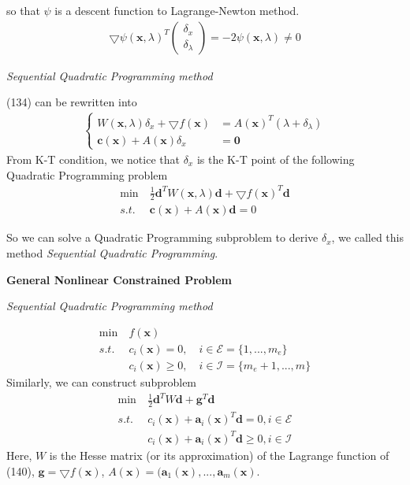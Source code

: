 \documentclass[runningheads]{llncs}
\begin{document}
so that $\psi$ is a descent function to Lagrange-Newton method.
\begin{align}
    \bigtriangledown \psi(\mathbf{x}, \lambda)^T
    \left(\begin{array}{ll}
        \delta_{x} \\
        \delta_\lambda
    \end{array}\right) = 
    -2 \psi(\mathbf{x}, \lambda) \neq 0
\end{align}
\par
\emph{Sequential Quadratic Programming method}
\par
(134) can be rewritten into
\begin{align}
    \left\{
        \begin{array}{ll}
            W(\mathbf{x}, \lambda) \delta_x + \bigtriangledown f(\mathbf{x})
            &= A(\mathbf{x})^T(\lambda + \delta_\lambda) \\
            \mathbf{c}(\mathbf{x}) + A(\mathbf{x})\delta_x &= \mathbf{0}
        \end{array}
        \right.
\end{align}
From K-T condition, we notice that $\delta_x$ is the
K-T point of the following Quadratic Programming problem
\begin{align}
    \min \ &\frac{1}{2} \mathbf{d}^T W(\mathbf{x}, \lambda) \mathbf{d}
    + \bigtriangledown f(\mathbf{x})^T\mathbf{d} \\
    s.t. \ &\mathbf{c}(\mathbf{x}) + A(\mathbf{x})\mathbf{d} = 0
\end{align}

So we can solve a Quadratic Programming subproblem to
derive $\delta_x$, we called this method
\emph{Sequential Quadratic Programming}.

\par
\noindent\textbf{General Nonlinear Constrained Problem}
\par
\emph{Sequential Quadratic Programming method}
\par
\begin{align}
    \min \ &f(\mathbf{x}) \\
    s.t. \ &c_i(\mathbf{x}) = 0, \quad i \in \mathcal{E} = \{1,...,m_e\} \\
    &c_i(\mathbf{x}) \geq 0, \quad i \in \mathcal{I} = \{m_e+1,...,m\}
\end{align}
Similarly, we can construct subproblem
\begin{align}
    \min \ &\frac{1}{2}\mathbf{d}^TW\mathbf{d} + \mathbf{g}^T\mathbf{d} \\
    s.t. \ &c_i(\mathbf{x}) + \mathbf{a}_i(\mathbf{x})^T\mathbf{d} = 0, i \in \mathcal{E} \\
     &c_i(\mathbf{x}) + \mathbf{a}_i(\mathbf{x})^T\mathbf{d} \geq 0, i \in \mathcal{I}
\end{align}
Here, $W$ is the Hesse matrix (or its approximation) of the Lagrange
function of (140), $\mathbf{g} = \bigtriangledown f(\mathbf{x})$,
$A(\mathbf{x}) = (\mathbf{a}_1(\mathbf{x}),...,\mathbf{a}_m(\mathbf{x})$.
\end{document}
